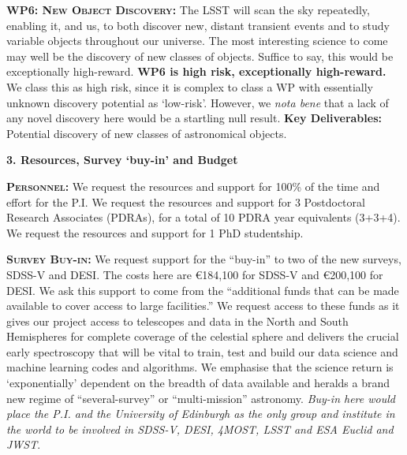 \documentclass[oneside, a4paper, onecolumn, 11pt]{article}
\begin{document}
\smallskip
\smallskip
\noindent
\textbf{\textsc{WP6: New Object Discovery:}} 
The LSST will scan the sky repeatedly, enabling it, and us, to both
discover new, distant transient events and to study variable objects
throughout our universe. The most interesting science to come may well
be the discovery of new classes of objects. Suffice to say, this would
be exceptionally high-reward.  {\bf WP6 is high risk, exceptionally
high-reward.}  We class this as high risk, since it is complex to
class a WP with essentially unknown discovery potential as `low-risk'.
However, we {\it nota bene} that a lack of any novel discovery here
would be a startling null result.  {\bf Key Deliverables:} Potential
discovery of new classes of astronomical objects.



\smallskip \smallskip
\smallskip \smallskip
\noindent
\large
{\bf{\textcolor{Cerulean}{3. Resources,  Survey `buy-in' and Budget}}}
\normalsize

\smallskip
\smallskip
\noindent
\textbf{\textsc{Personnel:}} 
We request the resources and support for 100\% of the time and effort
for the P.I. We request the resources and support for 3 Postdoctoral
Research Associates (PDRAs), for a total of 10 PDRA year equivalents
(3+3+4). We request the resources and support for 1 PhD studentship.


\smallskip
\smallskip
\noindent
\textbf{\textsc{Survey Buy-in:}} 
We request support for the ``buy-in'' to two of the new surveys,
SDSS-V and DESI. The costs here are \euro184,100 for SDSS-V and
\euro200,100 for DESI.  We ask this support to come from the
``additional funds that can be made available to cover access to large
facilities.''  We request access to these funds as it
gives our project access to telescopes and data in the North and
South Hemispheres for complete coverage of the celestial sphere 
and delivers the crucial early spectroscopy that will be vital to
train, test and build our data science and machine learning codes and
algorithms.  We emphasise that the science return is `exponentially'
dependent on the breadth of data available and heralds a brand new regime of ``several-survey'' or
``multi-mission'' astronomy.  {\it Buy-in here would place the
P.I. and the University of Edinburgh as the only group and institute
in the world to be involved in SDSS-V, DESI, 4MOST, LSST and ESA {\it
Euclid} and JWST}.
\end{document}
